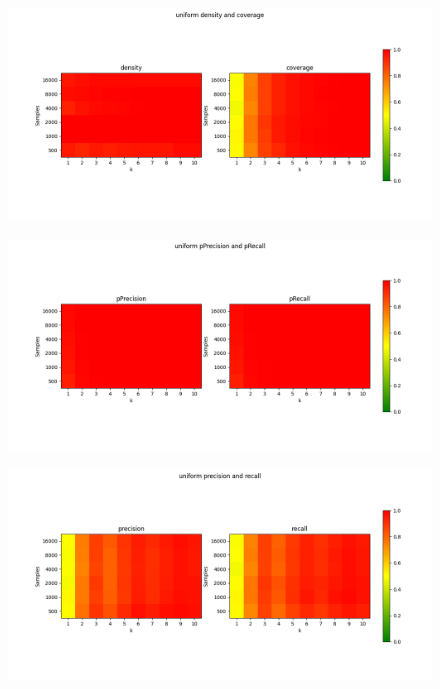    \begin{figure}
        \centering
        \includegraphics[width=\linewidth]{../images/toyexperiments/kdim/uniform_density_coverage.png}
    \end{figure}

    \begin{figure}
        \centering
        \includegraphics[width=\linewidth]{../images/toyexperiments/kdim/uniform_pPrecision_pRecall.png}
    \end{figure}

    \begin{figure}
        \centering
        \includegraphics[width=\linewidth]{../images/toyexperiments/kdim/uniform_precision_recall.png}
    \end{figure}

